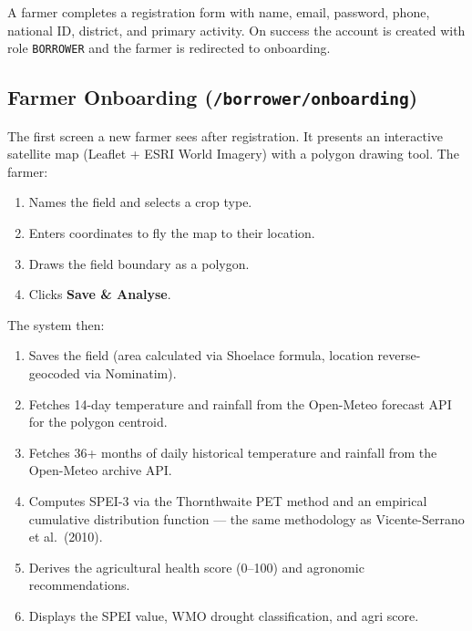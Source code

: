 \documentclass[12pt,a4paper]{article}
\begin{document}
A farmer completes a registration form with name, email, password, phone,
national ID, district, and primary activity.  On success the account is
created with role \texttt{BORROWER} and the farmer is redirected to onboarding.

\subsection{Farmer Onboarding (\texttt{/borrower/onboarding})}

The first screen a new farmer sees after registration.  It presents an
interactive satellite map (Leaflet + ESRI World Imagery) with a polygon
drawing tool.  The farmer:

\begin{enumerate}
  \item Names the field and selects a crop type.
  \item Enters coordinates to fly the map to their location.
  \item Draws the field boundary as a polygon.
  \item Clicks \textbf{Save \& Analyse}.
\end{enumerate}

The system then:

\begin{enumerate}
  \item Saves the field (area calculated via Shoelace formula, location
        reverse-geocoded via Nominatim).
  \item Fetches 14-day temperature and rainfall from the Open-Meteo forecast
        API for the polygon centroid.
  \item Fetches 36+ months of daily historical temperature and rainfall from
        the Open-Meteo archive API.
  \item Computes SPEI-3 via the Thornthwaite PET method and an empirical
        cumulative distribution function --- the same methodology as
        Vicente-Serrano et al.\ (2010).
  \item Derives the agricultural health score (0--100) and agronomic
        recommendations.
  \item Displays the SPEI value, WMO drought classification, and agri score.
\end{enumerate}

\end{document}

